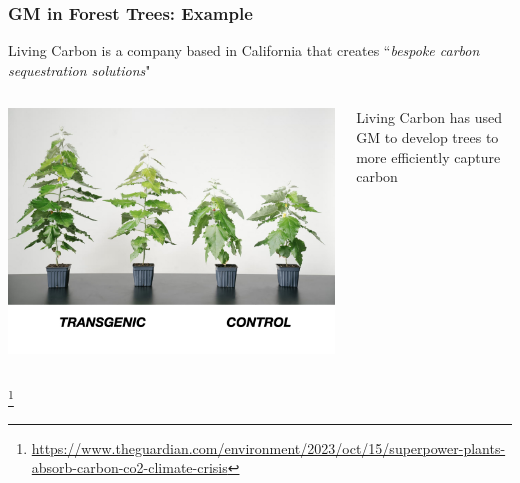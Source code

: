 \documentclass[xcolor=dvipsnames]{beamer}
\newcommand\blfootnote[1]{%
	\begingroup
	\renewcommand\thefootnote{}\footnote{#1}%
	\addtocounter{footnote}{-1}%
	\endgroup
}
\begin{document}
\begin{frame}
	\frametitle{GM in Forest Trees: Example}
	
	Living Carbon is a company based in California that creates ``\textit{bespoke carbon sequestration solutions}"  \\
	\vspace{25pt}
	\begin{columns}
		\begin{column}{0.4\textwidth}
				\centering	\includegraphics[keepaspectratio, width  = \textwidth]{img/livingCarbon}
		\end{column}
		\begin{column}{0.5\textwidth}
			
			Living Carbon has used GM to develop trees to more efficiently capture carbon
			
		\end{column}
	\end{columns}
\blfootnote{\url{https://www.theguardian.com/environment/2023/oct/15/superpower-plants-absorb-carbon-co2-climate-crisis}}
	
\end{frame}
\end{document}
